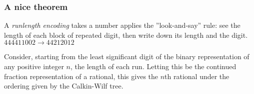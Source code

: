 \subsubsection*{A nice theorem}
\begin{definition}
    A \emph{runlength encoding} takes a number applies the ”look-and-say” rule: see
the length of each block of repeated digit, then write down its length and the digit. 
$444411002 \rightarrow 44212012$
\end{definition}
\begin{theorem}
    Consider, starting from the least significant digit of the binary representation of any positive integer $n$, the length of each run. Letting this be the continued fraction
representation of a rational, this gives the $n$th rational under the ordering given by the
Calkin-Wilf tree.
\end{theorem}
